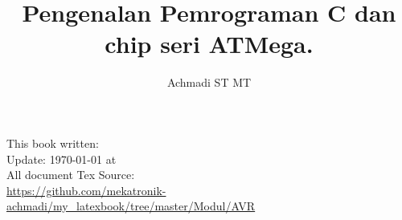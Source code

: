 \documentclass[12pt,]{article}
\title{\Large \bf
	Pengenalan Pemrograman C dan chip seri ATMega.
}
\author{Achmadi ST MT}
\date{}
\begin{document}
	\maketitle
	\thispagestyle{empty}
	\pagestyle{empty}

	\vspace*{550px}
	\noindent This book written:\\
	Update: {\today} at \currenttime\\

	\noindent All document Tex Source:\\
	\url{https://github.com/mekatronik-achmadi/my_latexbook/tree/master/Modul/AVR}


	\newpage
	\tableofcontents

	\newpage
%
%
%
%
\end{document}
